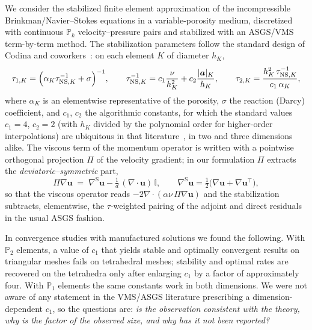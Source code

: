 \documentclass[11pt,a4paper]{article}
\theoremstyle{remark}
\newcommand{\PP}{\mathbb{P}}
\newcommand{\symgrad}{\nabla^{\mathrm{S}}}
\newcommand{\Proj}{\Pi}
\begin{document}
We consider the stabilized finite element approximation of the
incompressible Brinkman/Navier--Stokes equations in a variable-porosity
medium, discretized with continuous $\PP_k$ velocity--pressure pairs
and stabilized with an ASGS/VMS term-by-term method. The stabilization
parameters follow the standard design of Codina and
coworkers~\cite{Codina2000,Codina2002,CodinaVMSChapter}: on each
element $K$ of diameter $h_K$,
%
\begin{equation}
\label{eq:taus}
\tau_{1,K}
 = \Bigl( \alpha_K \tau_{\mathrm{NS},K}^{-1} + \sigma \Bigr)^{-1},
 \qquad
\tau_{\mathrm{NS},K}^{-1}
 = c_1 \frac{\nu}{h_K^2} + c_2 \frac{|\boldsymbol a|_K}{h_K},
 \qquad
\tau_{2,K} = \frac{h_K^2\,\tau_{\mathrm{NS},K}^{-1}}{c_1\,\alpha_K},
\end{equation}
%
where $\alpha_K$ is an elementwise representative of the porosity,
$\sigma$ the reaction (Darcy) coefficient, and $c_1$, $c_2$ the
algorithmic constants, for which the standard values $c_1 = 4$, $c_2 =
2$ (with $h_K$ divided by the polynomial order for higher-order
interpolations) are ubiquitous in that
literature~\cite{Codina2000,Codina2002,CodinaVMSChapter}, in two and
three dimensions alike. The viscous term of the momentum operator is
written with a pointwise orthogonal projection $\Proj$ of the velocity
gradient; in our formulation $\Proj$ extracts the
\emph{deviatoric--symmetric} part,
%
\begin{equation}
\label{eq:proj}
\Proj \nabla \boldsymbol u
 \;=\; \symgrad \boldsymbol u
   - \tfrac{1}{d}\,(\nabla\!\cdot\!\boldsymbol u)\,\mathbb I ,
\qquad
\symgrad \boldsymbol u
 = \tfrac12\bigl(\nabla\boldsymbol u + \nabla\boldsymbol u^{\!\top}\bigr),
\end{equation}
%
so that the viscous operator reads
$-2\nabla\!\cdot\!(\alpha\nu\,\Proj\nabla\boldsymbol u)$ and the
stabilization subtracts, elementwise, the $\tau$-weighted pairing of
the adjoint and direct residuals in the usual ASGS fashion.

In convergence studies with manufactured solutions we found the
following. With $\PP_2$ elements, a value of $c_1$ that yields stable
and optimally convergent results on triangular meshes fails on
tetrahedral meshes; stability and optimal rates are recovered on the
tetrahedra only after enlarging $c_1$ by a factor of approximately
four. With $\PP_1$ elements the same constants work in both dimensions.
We were not aware of any statement in the VMS/ASGS literature
prescribing a dimension-dependent $c_1$, so the questions are:
\emph{is the observation consistent with the theory, why is the factor
of the observed size, and why has it not been reported?}
\end{document}
